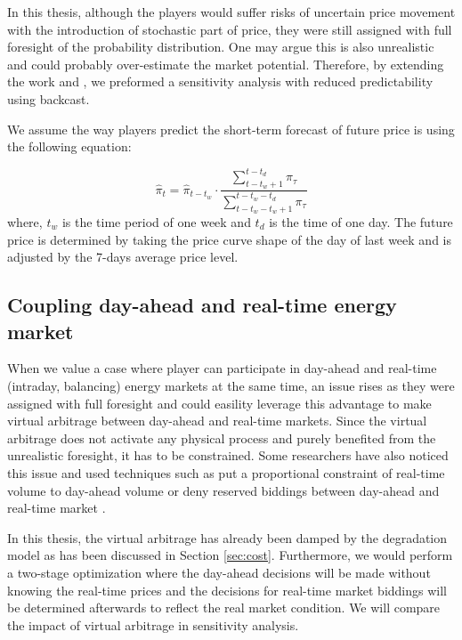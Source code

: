 In this thesis, although the players would suffer risks of uncertain price movement with the introduction of stochastic part of price, they were still assigned with full foresight of the probability distribution. One may argue this is also unrealistic and could probably over-estimate the market potential. Therefore, by extending the work \cite{Drury2011} and \cite{Sioshansi2009}, we preformed a sensitivity analysis with reduced predictability using backcast.

We assume the way players predict the short-term forecast of future price is using the following equation:

\begin{equation}
\hat{\pi}_t = \hat{\pi}_{t-t_w} \cdot \frac{\sum_{t-t_w+1}^{t-t_d}\pi_{\tau}}{\sum_{t-t_w-t_w+1}^{t-t_w - t_d}\pi_{\tau}}
\end{equation}
where, $t_w$ is the time period of one week and $t_d$ is the time of one day. The future price is determined by taking the price curve shape of the day of last week and is adjusted by the 7-days average price level.

\subsection{Coupling day-ahead and real-time energy market}

When we value a case where player can participate in day-ahead and real-time (intraday, balancing) energy markets at the same time, an issue rises as they were assigned with full foresight and could easility leverage this advantage to make virtual arbitrage between day-ahead and real-time markets. Since the virtual arbitrage does not activate any physical process and purely benefited from the unrealistic foresight, it has to be constrained. Some researchers have also noticed this issue and used techniques such as put a proportional constraint of real-time volume to day-ahead volume \cite{Han2017} or deny reserved biddings between day-ahead and real-time market \cite{Berrada2016}.

In this thesis, the virtual arbitrage has already been damped by the degradation model as has been discussed in Section \ref{sec:cost}. Furthermore, we would perform a two-stage optimization where the day-ahead decisions will be made without knowing the real-time prices and the decisions for real-time market biddings will be determined afterwards to reflect the real market condition. We will compare the impact of virtual arbitrage in sensitivity analysis. 

